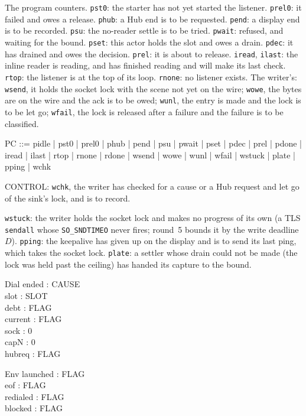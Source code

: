 \documentclass[a4paper,10pt,fleqn]{article}
\begin{document}
The program counters.  \texttt{pst0}: the starter has not yet started the
listener.  \texttt{prel0}: it failed and owes a release.  \texttt{phub}: a Hub
end is to be requested.  \texttt{pend}: a display end is to be recorded.
\texttt{psu}: the no-reader settle is to be tried.  \texttt{pwait}: refused, and
waiting for the bound.  \texttt{pset}: this actor holds the slot and owes a
drain.  \texttt{pdec}: it has drained and owes the decision.  \texttt{prel}: it
is about to release.  \texttt{iread}, \texttt{ilast}: the inline reader is
reading, and has finished reading and will make its last check.  \texttt{rtop}:
the listener is at the top of its loop.  \texttt{rnone}: no listener exists.
The writer's: \texttt{wsend}, it holds the socket lock with the scene not yet on
the wire; \texttt{wowe}, the bytes are on the wire and the ack is to be owed;
\texttt{wunl}, the entry is made and the lock is to be let go; \texttt{wfail},
the lock is released after a failure and the failure is to be classified.

\begin{zed}
  PC ::= pidle | pst0 | prel0 | phub | pend | psu | pwait | pset | pdec | prel |
    pdone | iread | ilast | rtop | rnone | rdone | wsend | wowe | wunl | wfail |
    wstuck | plate | pping | wchk
\end{zed}

CONTROL: \texttt{wchk}, the writer has checked for a cause or a Hub request and
let go of the sink's lock, and is to record.

\texttt{wstuck}: the writer holds the socket lock and makes no progress of its
own (a TLS \texttt{sendall} whose \texttt{SO\_SNDTIMEO} never fires; round~5
bounds it by the write deadline $D$).  \texttt{pping}: the keepalive has given up
on the display and is to send its last ping, which takes the socket lock.
\texttt{plate}: a settler whose drain could not be made
(the lock was held past the ceiling) has handed its capture to the bound.

\begin{schema}{Dial}
  ended : CAUSE \\
  slot : SLOT \\
  debt : FLAG \\
  current : FLAG \\
  sock : 0  \\
  capN : 0  \\
  hubreq : FLAG
\end{schema}

\begin{schema}{Env}
  launched : FLAG \\
  eof : FLAG \\
  redialed : FLAG \\
  blocked : FLAG
\end{schema}
\end{document}
